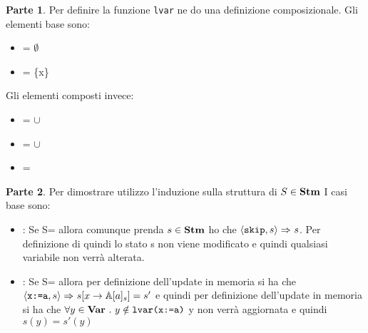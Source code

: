 {
	\hspace*{\textwidth-}\textbf{Parte 1}.
	Per definire la funzione \texttt{lvar} ne do una definizione
	composizionale. Gli elementi base sono:
	\begin{itemize}
	\item \lvar{\skipistr} = $\emptyset$
	\item {} = \{x\}
	\end{itemize}
	Gli elementi composti invece:
	\begin{itemize}
	\item {} =  $\cup$ 
	\item {} =  $\cup$ 
	\item {} = 
	\end{itemize}

	\textbf{Parte 2}. Per dimostrare \exTwo{} utilizzo l'induzione sulla struttura
	di $S\in\mbox{\textbf{Stm}}$
	I casi base sono:
	\begin{itemize}
	\item {}: Se S=\skipistr{} allora comunque prenda 
	$s\in\mbox{\textbf{Stm}}$ ho che $\langle{}\textrm{\normalfont{\texttt{skip}}}, s\rangle{}\Rightarrow^{}s$. Per definizione di 
	\skipistr{} quindi lo stato s non viene modificato e quindi qualsiasi
	variabile non verrà alterata.

	\item {}: Se S= allora per
	definizione dell'update in memoria si ha che 
	$\langle{}\textrm{\normalfont{\texttt{x:=a}}}, s\rangle{}\Rightarrow^{}s[x\rightarrow\mathbb{A}[a]_s]=s'$ e
	quindi per definizione dell'update in memoria si ha che 
	$\forall{}y\in\mbox{\textbf{Var}}~.~y\notin\textrm{\normalfont{\texttt{lvar(\textrm{\normalfont{\texttt{x:=a}}})}}}$ y non verrà aggiornata
	e quindi $s(y)=s'(y)$
	\end{itemize}


}
